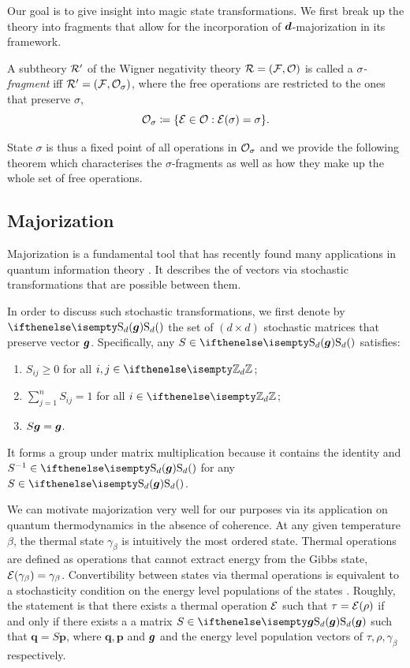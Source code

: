 Our goal is to give insight into magic state transformations.
We first break up the theory into fragments that allow for the incorporation of $\bm{d}$-majorization in its framework.
\begin{definition}\label{def:sigmafrag}
    A subtheory $\mathcal{R}'$ of the Wigner negativity theory $\mathcal{R} = (\mathcal{F}, \mathcal{O})$ is called a \emph{$\sigma$-fragment} iff $\mathcal{R}' = (\mathcal{F}, \mathcal{O}_\sigma)$, where the free operations are restricted to the ones that preserve $\sigma$,
    \begin{equation}
        \mathcal{O}_\sigma \coloneqq \{ \mathcal{E} \in \mathcal{O}: \mathcal{E}(\sigma) = \sigma \}.
    \end{equation}
\end{definition}

State $\sigma$ is thus a fixed point of all operations in $\mathcal{O}_\sigma$ and we provide the following theorem which characterises the $\sigma$-fragments as well as how they make up the whole set of free operations. 

\subsection{Majorization}\label{sec:major}

Majorization is a fundamental tool that has recently found many applications in quantum information theory .
It describes the  of vectors via stochastic transformations that are possible between them.

In order to discuss such stochastic transformations, we first denote by $\stoch$ the set of $(d \times d)$ stochastic matrices that preserve vector $\bm{g}$.
Specifically, any $S \in \stoch$ satisfies:
\begin{enumerate}
    \item $S_{ij} \geq 0$ for all $i, j \in \zd$;
    \item $\sum\limits_{j=1}^n S_{ij} = 1$ for all $i \in \zd$;
    \item $S\bm{g} = \bm{g}$.
\end{enumerate}
It forms a group under matrix multiplication because it contains the identity and $S^{-1} \in \stoch$ for any $S \in \stoch$.

We can motivate majorization very well for our purposes via its application on quantum thermodynamics in the absence of coherence.
At any given temperature $\beta$, the thermal state $\gamma_\beta$ is intuitively the most ordered state. 
Thermal operations are defined as operations that cannot extract energy from the Gibbs state, $\mathcal{E}(\gamma_\beta) = \gamma_\beta$.
Convertibility between states via thermal operations is equivalent to a stochasticity condition on the energy level populations of the states .
Roughly, the statement is that there exists a thermal operation $\mathcal{E}$ such that $\tau = \mathcal{E}(\rho)$ if and only if there exists a a matrix $S \in \stoch[\bmg]$ such that $\bm{q} = S\bm{p}$, where $\bm{q}, \bm{p}$ and $\bm{g}$ and the energy level population vectors of $\tau, \rho, \gamma_\beta$ respectively. 

